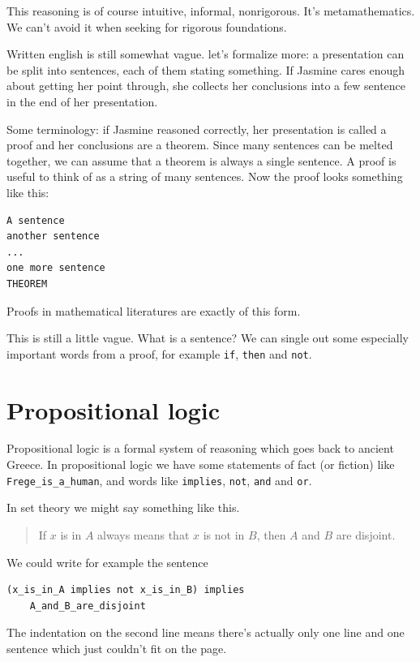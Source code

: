 \documentclass[11pt,oneside,%
]{memoir}
\theoremstyle{definition}
\begin{document}
This reasoning is of course intuitive, informal, nonrigorous. It's metamathematics. We can't avoid it when seeking for rigorous foundations.

Written english is still somewhat vague. let's formalize more: a presentation can be split into sentences, each of them stating something. If Jasmine cares enough about getting her point through, she collects her conclusions into a few sentence in the end of her presentation.

Some terminology: if Jasmine reasoned correctly, her presentation is called a proof and her conclusions are a theorem. Since many sentences can be melted together, we can assume that a theorem is always a single sentence. A proof is useful to think of as a string of many sentences. Now the proof looks something like this:
\begin{lstlisting}
A sentence
another sentence
...
one more sentence
THEOREM
\end{lstlisting}
Proofs in mathematical literatures are exactly of this form.

This is still a little vague. What is a sentence? We can single out some especially important words from a proof, for example \lstinline!if!, \lstinline!then! and \lstinline!not!.

\section{Propositional logic}

Propositional logic is a formal system of reasoning which goes back to ancient Greece. In propositional logic we have some statements of fact (or fiction) like \lstinline!Frege_is_a_human!, and words like \lstinline!implies!, \lstinline!not!, \lstinline!and! and \lstinline!or!.

In set theory we might say something like this.
\begin{quote}
    If \(x\) is in \(A\) always means that \(x\) is not in \(B\), then \(A\) and \(B\) are disjoint.
\end{quote}%


 We could write for example the sentence
\begin{lstlisting}
(x_is_in_A implies not x_is_in_B) implies
    A_and_B_are_disjoint
\end{lstlisting}
The indentation on the second line means there's actually only one line and one sentence which just couldn't fit on the page.
\end{document}
